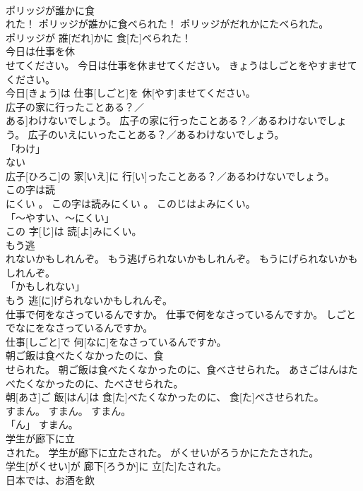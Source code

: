 \documentclass[8pt]{extreport}
\begin{document}
\begin{CJK}{UTF8}{min}
\\	ポリッジが誰かに食
\\	れた！	ポリッジが誰かに食べられた！	ポリッジがだれかにたべられた。	
\\	ポリッジが 誰[だれ]かに 食[た]べられた！		
\\	今日は仕事を休
\\	せてください。	今日は仕事を休ませてください。	きょうはしごとをやすませてください。	
\\	今日[きょう]は 仕事[しごと]を 休[やす]ませてください。		
\\	広子の家に行ったことある？／
\\	ある]わけないでしょう。	広子の家に行ったことある？／あるわけないでしょう。	広子のいえにいったことある？／あるわけないでしょう。	
\\	「わけ」 
\\	ない 
\\	広子[ひろこ]の 家[いえ]に 行[い]ったことある？／あるわけないでしょう。		
\\	この字は読
\\	にくい 。	この字は読みにくい 。	このじはよみにくい。	
\\	「～やすい、～にくい」 
\\	この 字[じ]は 読[よ]みにくい。		
\\	もう逃
\\	れないかもしれんぞ。	もう逃げられないかもしれんぞ。	もうにげられないかもしれんぞ。	
\\	「かもしれない」 
\\	もう 逃[に]げられないかもしれんぞ。		
\\	仕事で何をなさっているんですか。	仕事で何をなさっているんですか。	しごとでなにをなさっているんですか。	
\\	仕事[しごと]で 何[なに]をなさっているんですか。		
\\	朝ご飯は食べたくなかったのに、食
\\	せられた。	朝ご飯は食べたくなかったのに、食べさせられた。	あさごはんはたべたくなかったのに、たべさせられた。	
\\	朝[あさ]ご 飯[はん]は 食[た]べたくなかったのに、 食[た]べさせられた。		
\\	すまん。	すまん。	すまん。	
\\	「ん」	すまん。		
\\	学生が廊下に立
\\	された。	学生が廊下に立たされた。	がくせいがろうかにたたされた。	
\\	学生[がくせい]が 廊下[ろうか]に 立[た]たされた。		
\\	日本では、お酒を飲

\end{CJK}
\end{document}
